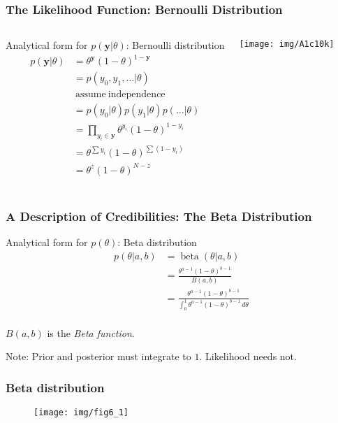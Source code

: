 \documentclass[usenames,dvipsnames,table]{beamer}
\newcommand{\bern}[2]{{#2}^{#1}({1-#2})^{1-#1}}
\begin{document}
\begin{frame}
\frametitle{The Likelihood Function: Bernoulli Distribution}
\begin{columns}[c]
Analytical form for $p(\mathbf{y} | \theta)$: Bernoulli distribution
\begin{align*}
p(\mathbf{y}|\theta) &= \bern{\mathbf{y}}{\theta} \tag{6.1} \\
                     &= p(y_0, y_1, \ldots|\theta) \\
                     &\ \mathrm{assume\ independence}\\
                     &= p(y_0 |\theta) p(y_1|\theta) p(\ldots|\theta) \\
                     &= \prod_{y_i \in \mathbf{y}} \bern{y_i}{\theta} \\
                     &= \theta^{\sum y_i}(1-\theta)^{\sum (1-y_i)} \\
                     &= \theta^{z}(1-\theta)^{N-z} \tag{6.2} \\
\end{align*}

\texttt{[image: img/A1c10k]}
\end{columns}
\end{frame}





\begin{frame}
\frametitle{A Description of Credibilities: The Beta Distribution}
Analytical form for $p(\theta)$: Beta distribution
\begin{align*}
p(\theta| a, b) &= \operatorname{beta}(\theta| a, b) \\
                &= \frac{\theta^{a-1} (1-\theta)^{b-1}}
                        {B(a, b)}\tag{6.3} \\
                &= \frac{\theta^{a-1} (1-\theta)^{b-1}}
                        {\int_0^1 \theta^{a-1} (1-\theta)^{b-1}\, d\theta} \\
\end{align*}

$B(a, b)$ is the \emph{Beta function}.

\vspace{1em}
Note: Prior and posterior must integrate to $1$. Likelihood needs not.

\end{frame}

\begin{frame}
\frametitle{Beta distribution}
\begin{figure}
\centering
\texttt{[image: img/fig6\_1]}
\end{figure}
\end{frame}
\end{document}
